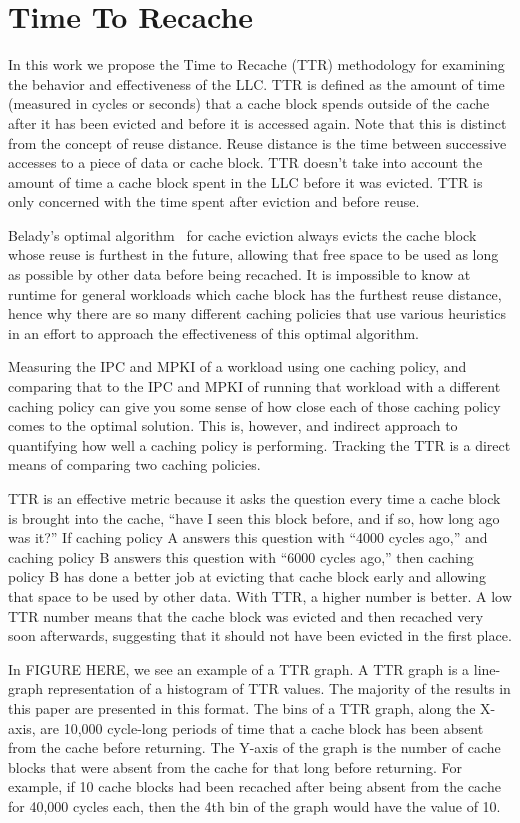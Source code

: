 \section{Time To Recache}

In this work we propose the Time to Recache (TTR) methodology for
examining the behavior and effectiveness of the LLC.  TTR is defined
as the amount of time (measured in cycles or seconds) that a cache
block spends outside of the cache after it has been evicted and
before it is accessed again.  Note that this is distinct from the
concept of reuse distance.  Reuse distance is the time between
successive accesses to a piece of data or cache block.  TTR doesn't
take into account the amount of time a cache block spent in the LLC
before it was evicted.  TTR is only concerned with the time spent
after eviction and before reuse.

Belady's optimal algorithm~\cite{belady66} for cache eviction always evicts
the cache block whose reuse is furthest in the future, allowing that
free space to be used as long as possible by other data before being
recached.  It is impossible to know at runtime for general workloads
which cache block has the furthest reuse distance, hence why there are
so many different caching policies that use various heuristics in an
effort to approach the effectiveness of this optimal algorithm.

Measuring the IPC and MPKI of a workload using one caching policy, and
comparing that to the IPC and MPKI of running that workload with a
different caching policy can give you some sense of how close each of
those caching policy comes to the optimal solution.  This is,
however, and indirect approach to quantifying how well a caching
policy is performing.  Tracking the TTR is a direct means of
comparing two caching policies.

TTR is an effective metric because it asks the question every time a
cache block is brought into the cache, ``have I seen this block
before, and if so, how long ago was it?''  If caching policy A answers
this question with ``4000 cycles ago,'' and caching policy B answers
this question with ``6000 cycles ago,'' then caching policy B has done
a better job at evicting that cache block early and allowing that
space to be used by other data.  With TTR, a higher number is better.
A low TTR number means that the cache block was evicted and then
recached very soon afterwards, suggesting that it should not have
been evicted in the first place.

In FIGURE HERE, we see an example of a TTR graph.  A TTR graph is a
line-graph representation of a histogram of TTR values.  The majority of
the results in this paper are presented in this format.  The bins of a
TTR graph, along the X-axis,  are 10,000 cycle-long periods of time that a cache block has
been absent from the cache before returning.  The Y-axis of the graph
is the number of cache blocks that were absent from the cache for that
long before returning.  For example, if 10 cache blocks had been
recached after being absent from the cache for 40,000 cycles each,
then the 4th bin of the graph would have the value of 10.

